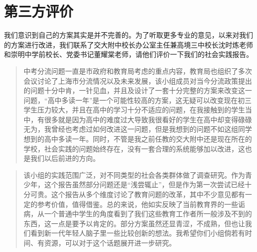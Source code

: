 \documentclass[12pt,UTF8]{ctexart}
\begin{document}
\newpage

\section{第三方评价}
\par {
	
	我们意识到自己的方案其实是并不完善的。为了听取更多专业的意见，以来对我们的方案进行改进，我们联系了交大附中校长办公室主任兼高境三中校长沈时炼老师和崇明中学前校长、党委书记董耀棠老师，请他们评价一下我们的社会实践报告。
	\begin{quote}
		\kaishu
		中考分流问题一直是市政府和教育局考虑的重点内容，教育局也组织了多次会议讨论了上海市分流情况以及未来发展，该小组成员对当今分流政策提出的问题十分中肯，一针见血，并且及设计了一套十分完整的方案来改变这一问题，“高中多读一年”是一个可能性较高的方案，这无疑可以改变现在初三学生压力较大，并且在高中的学习十分不适应的问题，在我接触到的学生当中，有很多就是因为高中的难度过大导致我很看好的学生在高中却变得碌碌无为，我曾经也考虑过如何改进这一问题，但是我想到的问题不如这组同学想到的高中多读一年。同时，不管是我之前任教的交大附中还是现在所在的学校，社会实践的问题始终存在，没有一套合理的系统能够加以改进，这也是我们以后前进的方向。\\
	\end{quote}
	\begin{quote}
		\kaishu
		该小组的实践范围广泛，对不同类型的社会各类群体做了调查研究。作为青少年，这个报告虽然部分问题还是“浅尝辄止”，但是作为第一次尝试已经十分可贵。这个报告从多个维度讨论了教育问题的改革，其中不少意见都有一定的参考价值，值得借鉴。总的来说，他如实反映了当前教育界的一些诟病，从一个普通中学生的角度看到了我们这些教育工作者所一般涉及不到的东西，这一点是要予以肯定的。部分方案虽然还显青涩，不成熟，但也让我们看到新一代年轻人脑子里一些比较创新的想法。我希望你们小组倘若有时间、有资源，可以对于这个话题展开进一步研究。
	\end{quote}
}

\newpage
\end{document}
